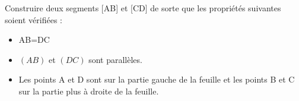 \documentclass[a4paper]{book}
\begin{document}
    \begin{exercice}

        Construire deux segments [AB] et [CD] de sorte que les propriétés suivantes soient vérifiées :
        \begin{itemize}
            \item AB=DC
            \item $(AB)$ et $(DC)$ sont parallèles.
            \item Les points A et D sont sur la partie gauche de la feuille et les points B et C sur la partie plus à droite de la feuille.
        \end{itemize}
        
    \end{exercice}
\end{document}
